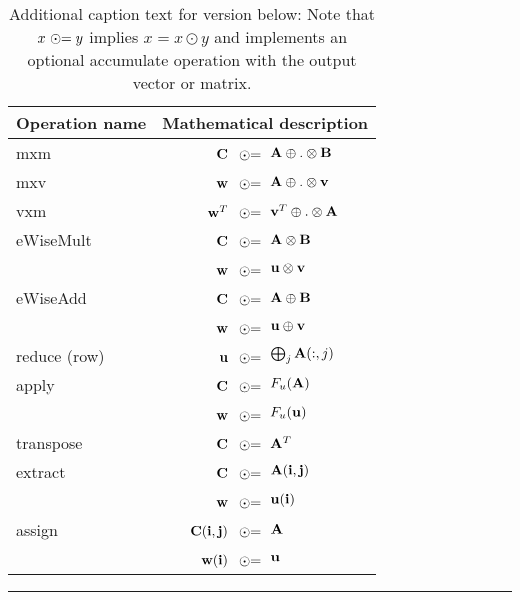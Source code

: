 \begin{table}[h]
\begin{center}
~\\
\newcommand{\odotequals}{~\odot\hspace{-0.1cm}=\hspace{-0.2cm}}
~\\
\caption*{Additional caption text for version below: Note that $x~\odot\hspace{-0.1cm}= y$ implies $x = x \odot y$ 
and implements an optional accumulate operation with the output vector or matrix.}
\begin{tabular}{l|rl}
{\sf Operation name} & \multicolumn{2}{c}{Mathematical description}  \\
\hline
{\sf mxm}          & ${\bf C}$    $\odotequals$ & ${\bf A} \oplus.\otimes {\bf B}$ \\
{\sf mxv}          & ${\bf w}$    $\odotequals$ & ${\bf A} \oplus.\otimes {\bf v}$ \\
{\sf vxm}          & ${\bf w}^T$  $\odotequals$ & ${\bf v}^T \oplus.\otimes {\bf A}$  \\
{\sf eWiseMult}    & ${\bf C}$    $\odotequals$ & ${\bf A} \otimes {\bf B}$ \\
                   & ${\bf w}$    $\odotequals$ & ${\bf u} \otimes {\bf v}$ \\
{\sf eWiseAdd}     & ${\bf C}$    $\odotequals$ & ${\bf A} \oplus {\bf B}$ \\
                   & ${\bf w}$    $\odotequals$ & ${\bf u} \oplus {\bf v}$ \\
{\sf reduce} (row) & ${\bf u}$    $\odotequals$ & $\bigoplus_j{\bf A}(:,j)$  \\
{\sf apply}        & ${\bf C}$    $\odotequals$ & $F_u({\bf A})$ \\
                   & ${\bf w}$    $\odotequals$ & $F_u({\bf u})$ \\
{\sf transpose}    & ${\bf C}$    $\odotequals$ & ${\bf A}^T$ \\
{\sf extract}      & ${\bf C}$    $\odotequals$ & ${\bf A}({\bf i},{\bf j})$ \\
                   & ${\bf w}$    $\odotequals$ & ${\bf u}({\bf i})$ \\
{\sf assign}       & ${\bf C}({\bf i},{\bf j})$  $\odotequals$ &  ${\bf A}$ \\
                   & ${\bf w}({\bf i})$  $\odotequals$ & ${\bf u}$ \\
\end{tabular}

\end{center}
\hrule
\end{table}

